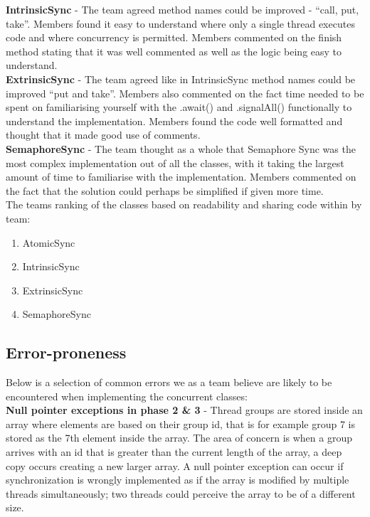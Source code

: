 \documentclass[11pt]{article}
\begin{document}
\textbf{IntrinsicSync} - The team agreed method names could be improved - “call, put, take”. Members found it easy to understand where only a single thread executes code and where concurrency is permitted. Members commented on the finish method stating that it was well commented as well as the logic being easy to understand. \\

\textbf{ExtrinsicSync} - The team agreed like in IntrinsicSync method names could be improved “put and take”. Members also commented on the fact time needed to be spent on familiarising yourself with the .await() and .signalAll() functionally to understand the implementation. Members found the code well formatted and thought that it made good use of comments. \\

\textbf{SemaphoreSync} - The team thought as a whole that Semaphore Sync was the most complex implementation out of all the classes, with it taking the largest amount of time to familiarise with the implementation. Members commented on the fact that the solution could perhaps be simplified if given more time.  \\

The teams ranking of the classes based on readability and sharing code within by team: 

\begin{enumerate}
	\item AtomicSync
	\item IntrinsicSync
	\item ExtrinsicSync
	\item SemaphoreSync
\end{enumerate}

\pagebreak
\subsection{Error-proneness}

Below is a selection of common errors we as a team believe are likely to be encountered when implementing the concurrent classes: \\

\textbf{Null pointer exceptions in phase 2 \& 3} - Thread groups are stored inside an array where elements are based on their group id, that is for example group 7 is stored as the 7th element inside the array. The area of concern is  when a group arrives with an id that is greater than the current length of the array, a deep copy occurs creating a new larger array. A null pointer exception can occur if synchronization is wrongly implemented as if the array is modified by multiple threads simultaneously; two threads could perceive the array to be of a different size.\\
\end{document}
